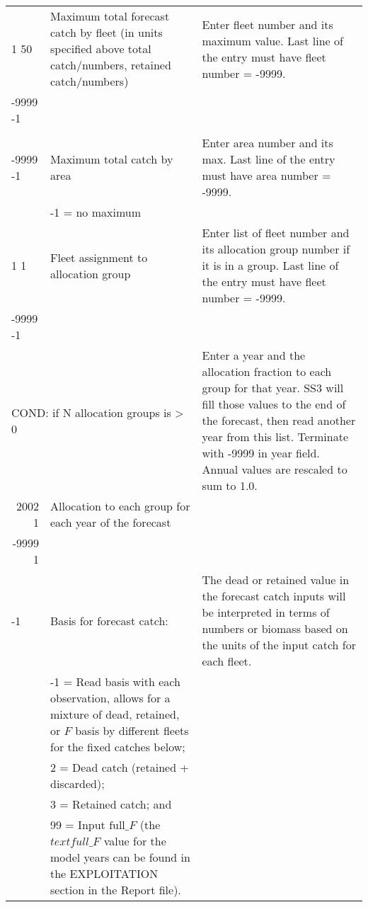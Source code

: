 \begin{landscape}
{\begin{longtable}{p{2cm} p{7cm} p{12cm}}
  \pagebreak
  1 50 & \multirow{1}{1cm}[-0.25cm]{\parbox{7cm}{Maximum total forecast catch by fleet (in units specified above total catch/numbers, retained catch/numbers)}} & \multirow{1}{1cm}[-0.25cm]{\parbox{12cm}{Enter fleet number and its maximum value. Last line of the entry must have fleet number = -9999.}} \Tstrut\Bstrut\\
  -9999 -1 & & \Bstrut\\
   & & \Bstrut\\
  \hline

  -9999 -1 & Maximum total catch by area & \multirow{1}{1cm}[-0.25cm]{\parbox{12cm}{Enter area number and its max. Last line of the entry must have area number = -9999.}} \Tstrut\\
    & -1 = no maximum & \Bstrut\\

  \hline
  1 1 & Fleet assignment to allocation group & \multirow{1}{1cm}[-0.25cm]{\parbox{12cm}{Enter list of fleet number and its allocation group number if it is in a group. Last line of the entry must have fleet number = -9999.}} \Tstrut\\
  -9999 -1 & & \\ 

  \multicolumn{2}{l}{COND: if N allocation groups is > 0} & \multirow{1}{1cm}[-0.25cm]{\parbox{12cm}{Enter a year and the allocation fraction to each group for that year. SS3 will fill those values to the end of the forecast, then read another year from this list. Terminate with -9999 in year field. Annual values are rescaled to sum to 1.0.}} \\
  \multicolumn{1}{r}{2002 1} & Allocation to each group for each year of the forecast & \\
  \multicolumn{1}{r}{-9999 1} & & \Bstrut\\

  \hline
  -1 & Basis for forecast catch: & \multirow{1}{1cm}[-0.25cm]{\parbox{12cm}{The dead or retained value in the forecast catch inputs will be interpreted in terms of numbers or biomass based on the units of the input catch for each fleet.}} \Tstrut\\
    & -1 = Read basis with each observation, allows for a mixture of dead, retained, or $F$ basis by different fleets for the fixed catches below; & \\
    & 2 = Dead catch (retained + discarded); & \\
    & 3 = Retained catch; and & \\
    & 99 = Input $\text{full\_}F$ (the $text{full\_}F$ value for the model years can be found in the EXPLOITATION section in the Report file). & \Bstrut\\
  

\end{longtable}}
\end{landscape}
